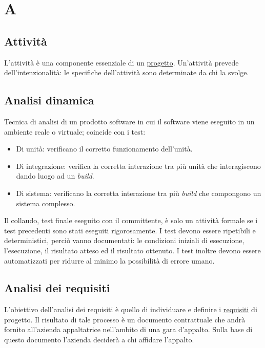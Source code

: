 





\copertina


\tableofcontents

\newpage
	\section{A}
	\subsection{Attività}
	\label{sec:attivita}
	L'attività è una componente essenziale di un \hyperref[sec:progetto]{progetto}. Un'attività prevede dell'intenzionalità: le specifiche dell'attività sono determinate da chi la svolge. 	
	
	\subsection{Analisi dinamica}
	\label{sec:analisidinamica}
	Tecnica di analisi di un prodotto software in cui il software viene eseguito in un ambiente reale o virtuale; coincide con i test: 
	\begin{itemize}  
		\item Di unità: verificano il corretto funzionamento dell'unità.
		\item Di integrazione: verifica la corretta interazione tra più unità che interagiscono dando luogo ad un \emph{build}.
		\item Di sistema: verificano la corretta interazione tra più \emph{build} che compongono un sistema complesso.
	\end{itemize}	
	Il collaudo, test finale eseguito con il committente, è solo un attività formale se i test precedenti sono stati eseguiti rigorosamente. I test devono essere ripetibili e deterministici, perciò vanno documentati: le condizioni iniziali di esecuzione, l'esecuzione, il risultato atteso ed il risultato ottenuto. I test inoltre devono essere automatizzati per ridurre al minimo la possibilità di errore umano.
	
	\subsection{Analisi dei requisiti}
	\label{sec:analisirequisiti}
	L'obiettivo dell'analisi dei requisiti è quello di individuare e definire i \hyperref[sec:requisito]{requisiti} di progetto. Il risultato di tale processo è un documento contrattuale che andrà fornito all'azienda appaltatrice nell'ambito di una gara d'appalto. Sulla base di questo documento l'azienda deciderà a chi affidare l'appalto.
	
